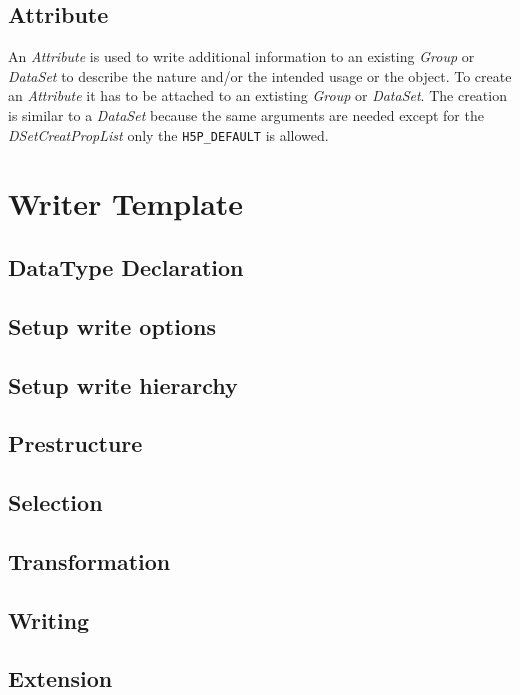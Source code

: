 \section{Attribute}
An \textit{Attribute} is used to write additional information to an existing \textit{Group} or \textit{DataSet} to describe the nature and/or the intended usage or the object. To create an \textit{Attribute} it has to be attached to an extisting \textit{Group} or \textit{DataSet}. The creation is similar to a \textit{DataSet} because the same arguments are needed except for the \textit{DSetCreatPropList} only the \texttt{H5P\_DEFAULT} is allowed.


\chapter{Writer Template}

\section{DataType Declaration}
\label{seq:datatypedec}


\section{Setup write options}

\section{Setup write hierarchy}

\section{Prestructure}

\section{Selection}

\section{Transformation}

\section{Writing}

\section{Extension}

